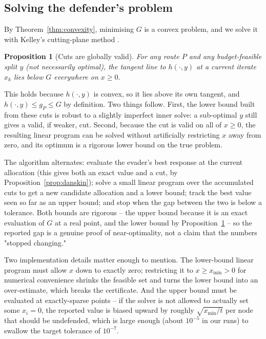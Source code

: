 \documentclass[11pt,a4paper]{article}
\theoremstyle{plain}
\newtheorem{proposition}[theorem]{Proposition}
\theoremstyle{definition}
\begin{document}
\subsection{Solving the defender's problem}
\label{sec:methods-cutting}

By Theorem~\ref{thm:convexity}, minimising $G$ is a convex problem, and we
solve it with Kelley's cutting-plane method \citep{kelley1960}.

\begin{proposition}[Cuts are globally valid]
\label{prop:cut-valid}
For any route $P$ and \emph{any} budget-feasible split $y$ (not
necessarily optimal), the tangent line to $h(\cdot,y)$ at a current
iterate $x_k$ lies below $G$ everywhere on $x\ge0$.
\end{proposition}
This holds because $h(\cdot,y)$ is convex, so it lies above its own
tangent, and $h(\cdot,y)\le g_P\le G$ by definition. Two things follow.
First, the lower bound built from these cuts is robust to a slightly
imperfect inner solve: a sub-optimal $y$ still gives a valid, if weaker,
cut. Second, because the cut is valid on all of $x\ge0$, the resulting
linear program can be solved without artificially restricting $x$ away
from zero, and its optimum is a rigorous lower bound on the true problem.

The algorithm alternates: evaluate the evader's best response at the
current allocation (this gives both an exact value and a cut, by
Proposition~\ref{prop:danskin}); solve a small linear program over the
accumulated cuts to get a new candidate allocation and a lower bound;
track the best value seen so far as an upper bound; and stop when the gap
between the two is below a tolerance. Both bounds are rigorous -- the
upper bound because it is an exact evaluation of $G$ at a real point, and
the lower bound by Proposition~\ref{prop:cut-valid} -- so the reported gap
is a genuine proof of near-optimality, not a claim that the numbers
"stopped changing."

Two implementation details matter enough to mention. The lower-bound
linear program must allow $x$ down to exactly zero; restricting it to
$x\ge x_{\min}>0$ for numerical convenience shrinks the feasible set and
turns the lower bound into an over-estimate, which breaks the certificate.
And the upper bound must be evaluated at exactly-sparse points -- if the
solver is not allowed to actually set some $x_i=0$, the reported value is
biased upward by roughly $\sqrt{x_{\min}/t}$ per node that should be
undefended, which is large enough (about $10^{-5}$ in our runs) to
swallow the target tolerance of $10^{-7}$.
\end{document}
